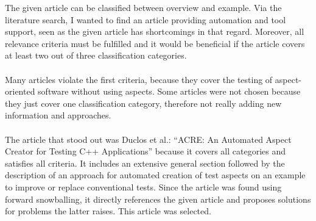 The given article can be classified between overview and example. Via the literature search, I wanted to find an article providing automation and tool support, seen as the given article has shortcomings in that regard. Moreover, all relevance criteria must be fulfilled and it would be beneficial if the article covers at least two out of three classification categories.\\
\\
Many articles violate the first criteria, because they cover the testing of aspect-oriented software without using aspects. Some articles were not chosen because they just cover one classification category, therefore not really adding new information and approaches.\\
\\
The article that stood out was Duclos et al.: “ACRE: An Automated Aspect Creator for Testing C++ Applications” \cite{Duclos} because it covers all categories and satisfies all criteria. It includes an extensive general section followed by the description of an approach for automated creation of test aspects on an example to improve or replace conventional tests. Since the article was found using forward snowballing, it directly references the given article and proposes solutions for problems the latter raises. This article was selected.

